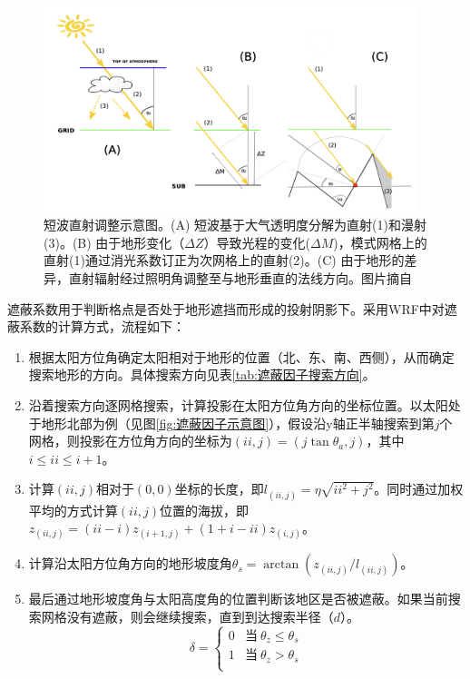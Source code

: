 {
\begin{figure}[htbp]
\centering
\includegraphics[width=0.97\textwidth]{Figures/尺度转换/短波直射调整图.png}
\caption{短波直射调整示意图。(A) 短波基于大气透明度分解为直射(1)和漫射(3)。(B) 由于地形变化（$\Delta Z$）导致光程的变化($\Delta M$)，模式网格上的直射(1)通过消光系数订正为次网格上的直射(2)。(C) 由于地形的差异，直射辐射经过照明角调整至与地形垂直的法线方向。图片摘自~\citep{fiddes2014toposcale}}
\label{fig:短波直射调整图}
\end{figure}
}

遮蔽系数用于判断格点是否处于地形遮挡而形成的投射阴影下。采用WRF中对遮蔽系数的计算方式，流程如下：
\begin{enumerate}
    \item 根据太阳方位角确定太阳相对于地形的位置（北、东、南、西侧），从而确定搜索地形的方向。具体搜索方向见表\ref{tab:遮蔽因子搜索方向}。
    \item 沿着搜索方向逐网格搜索，计算投影在太阳方位角方向的坐标位置。以太阳处于地形北部为例（见图\ref{fig:遮蔽因子示意图}），假设沿y轴正半轴搜索到第$j$个网格，则投影在方位角方向的坐标为$(ii,j)=(j \tan\theta_{a},j)$，其中$i \leq ii \leq i+1$。
    \item 计算$(ii,j)$相对于$(0,0)$坐标的长度，即$l_{\left(ii,j\right)}=\eta\sqrt{ii^{2}+j^{2}}$。同时通过加权平均的方式计算$(ii,j)$位置的海拔，即$z_{\left(ii,j\right)}=\left(ii-i\right)z_{\left(i+1,j\right)}+\left(1+i-ii\right)z_{\left(i,j\right)}$。
    \item 计算沿太阳方位角方向的地形坡度角$\theta_{s}=\arctan\left(z_{\left(ii,j\right)}/l_{\left(ii,j\right)}\right)$。
    \item 最后通过地形坡度角与太阳高度角的位置判断该地区是否被遮蔽。如果当前搜索网格没有遮蔽，则会继续搜索，直到到达搜索半径（$d$）。
    \begin{equation}
    \delta=\left\{\begin{array}{ll}
        0 & \text{当}\ \theta_{z} \leq \theta_{s} \\
        1 & \text{当}\ \theta_{z} > \theta_{s} \\ 
    \end{array}\right.
    \end{equation}
\end{enumerate}


